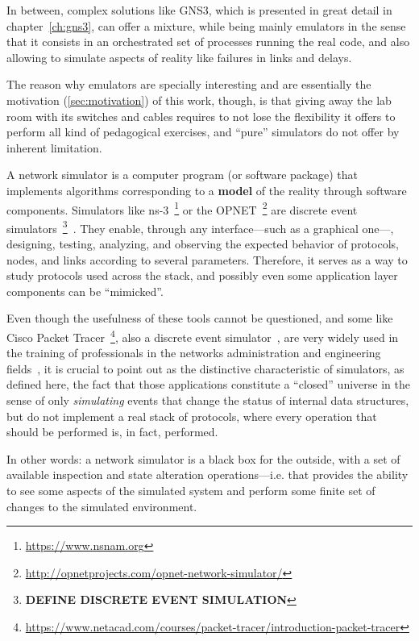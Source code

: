 In between, complex solutions like GNS3, which is presented in great detail in chapter~\ref{ch:gns3}, can offer a mixture, while being mainly emulators in the sense that it consists in an orchestrated set of processes running the real code, and also allowing to simulate aspects of reality like failures in links and delays.

The reason why emulators are specially interesting and are essentially the motivation (\ref{sec:motivation}) of this work, though, is that giving away the lab room with its switches and cables requires to not lose the flexibility it offers to perform all kind of pedagogical exercises, and ``pure'' simulators do not offer by inherent limitation.

A network simulator is a computer program (or software package) that implements algorithms corresponding to a \textbf{model} of the reality through software components.
Simulators like ns-3~\footnote{\url{https://www.nsnam.org}} or the OPNET~\footnote{\url{http://opnetprojects.com/opnet-network-simulator/}} are discrete event simulators~\footnote{\textbf{DEFINE DISCRETE EVENT SIMULATION}}~\cite{netsimoremu}.
They enable, through any interface---such as a graphical one---, designing, testing, analyzing, and observing the expected behavior of protocols, nodes, and links according to several parameters. Therefore, it serves as a way to study protocols used across the stack, and possibly even some application layer components can be ``mimicked''.

Even though the usefulness of these tools cannot be questioned, and some like Cisco Packet Tracer~\footnote{\url{https://www.netacad.com/courses/packet-tracer/introduction-packet-tracer}}, also a discrete event simulator~\cite{evaluatingnetsimmethodologicapproach}, are very widely used in the training of professionals in the networks administration and engineering fields~\cite{rolepackettracer}, it is crucial to point out as the distinctive characteristic of simulators, as defined here, the fact that those applications constitute a ``closed'' universe in the sense of only \emph{simulating} events that change the status of internal data structures, but do not implement a real stack of protocols, where every operation that should be performed is, in fact, performed. %

In other words: a network simulator is a black box for the outside, with a set of available inspection and state alteration operations---i.e. that provides the ability to see some aspects of the simulated system and perform some finite set of changes to the simulated environment.

